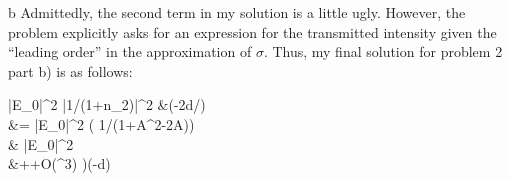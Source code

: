 \begin{homeworkProblem}
\begin{homeworkSection}{b}
	Admittedly, the second term in my solution is a little ugly. However, the problem explicitly asks for an expression for the transmitted intensity given the ``leading order'' in the approximation of $\sigma$. Thus, my final solution for problem 2 part b) is as follows:
	\\
	
	\begin{problemAnswer}{
	|E_0|^2 |1/(1+n_2)|^2 &\exp(-2d/\delta) \\ &= |E_0|^2 \Big( 1/(1+A^2-2A\cos\phi)\Big) \\ 
	& \approx |E_0|^2  \\
	&++O\left(\sigma ^3\right) \Big)\exp \Big(-d\Big)
	}
	\end{problemAnswer}
\end{homeworkSection}
\end{homeworkProblem}

